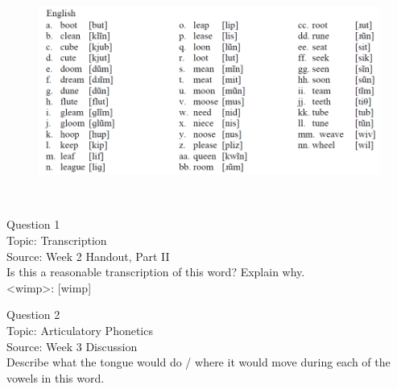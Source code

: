 \documentclass[12pt]{article}
\begin{document}
\begin{figure}[H]
\includegraphics{../images/english12.png}
\end{figure}

\newpage

\begin{center}
\textbf{{\color{red}{\HUGE END OF EXAM}}}\\

\end{center}
\newpage

\begin{center}
\textbf{{\color{blue}{\HUGE START OF EXAM\\}}}

\textbf{{\color{blue}{\HUGE Student ID: 19711\\}}}

\textbf{{\color{blue}{\HUGE \\}}}

\end{center}
\newpage

{\large Question 1}\\

Topic: Transcription\\
Source: Week 2 Handout, Part II\\

Is this a reasonable transcription of this word? Explain why.\\

<wimp>: {[wimp]}


\newpage

{\large Question 2}\\

Topic: Articulatory Phonetics\\
Source: Week 3 Discussion\\

Describe what the tongue would do / where it would move during each of the vowels in this word.\\
\end{document}
